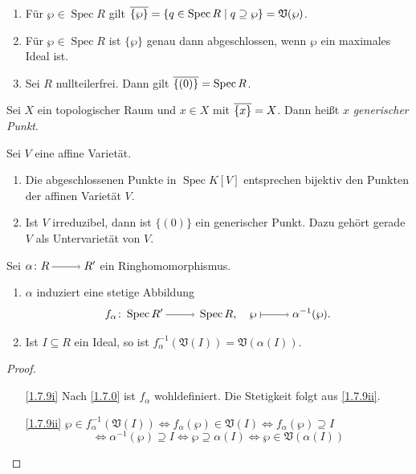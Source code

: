 \documentclass[a4paper,12pt,index=toc]{scrbook}
\theoremstyle{keinenummern} %
\def\V{\mathfrak{V}}
\newcommand{\Spec}{\operatorname{Spec}}
\def\Bar#1{\ensuremath\overline{#1}}
\begin{document}
\begin{bem}\label{1.7.6}
  \begin{enumerate}
  \item{} Für $\wp\in\Spec R$ gilt $\Bar{\{\wp\}}=\{q\in\Spec R\mid q\supseteq \wp\}=\V(\wp)$.
  \item{} Für $\wp\in\Spec R$ ist $\{\wp\}$ genau dann abgeschlossen, wenn $\wp$ ein maximales Ideal ist.
  \item{} Sei $R$ nullteilerfrei. Dann gilt $\Bar{\{(0)\}}=\Spec R$.
  \end{enumerate}
\end{bem}

\begin{bem}\label{1.7.7}
  Sei $X$ ein topologischer Raum und $x\in X$ mit $\Bar{\{x\}}=X$. Dann heißt $x$ \emph{generischer Punkt}.
\end{bem}

\begin{bsp}\label{1.7.8}
  Sei $V$ eine affine Varietät.
  \begin{enumerate}
  \item Die abgeschlossenen Punkte in $\Spec K[V]$ entsprechen bijektiv den Punkten der affinen Varietät $V$.
  \item Ist $V$ irreduzibel, dann ist $\{(0)\}$ ein generischer Punkt. Dazu gehört gerade $V$ als Untervarietät von $V$.
  \end{enumerate}
\end{bsp}


\begin{bem}\label{1.7.9}
  Sei $\alpha\colon R\ra R'$ ein Ringhomomorphismus.
  \begin{enumerate}
  \item{} $\alpha$ induziert eine stetige Abbildung \begin{equation*} f_\alpha\colon \Spec R'\ra\Spec R,\quad
    \wp\mapsto\alpha^{-1}(\wp). \end{equation*}
  \item{} Ist $I\subseteq R$ ein Ideal, so ist $f_\alpha^{-1}(\V(I))=\V(\alpha(I))$.
  \end{enumerate}
\end{bem}
\begin{proof}
  \begin{enumerate}
  \item[\ref{1.7.9i}] Nach \cref{1.7.0} ist $f_\alpha$ wohldefiniert. Die Stetigkeit folgt aus \ref{1.7.9ii}.
  \item[\ref{1.7.9ii}]
      $\wp\in f_\alpha^{-1}(\V(I)) \iff f_\alpha(\wp)\in\V(I) \iff f_\alpha(\wp)\supseteq I$%
      \begin{equation*}\iff \alpha^{-1}(\wp)\supseteq I \iff \wp\supseteq\alpha(I) \iff \wp\in\V(\alpha(I))\end{equation*}
  \end{enumerate}
\end{proof}
\end{document}
